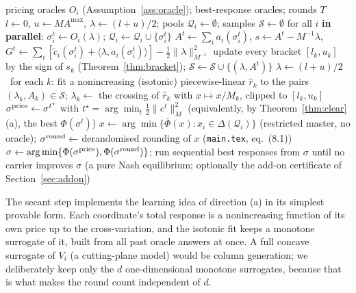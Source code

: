 \documentclass[11pt]{article}
\theoremstyle{definition}
\theoremstyle{remark}
\newcommand{\ip}[2]{\langle #1,#2\rangle}
\newcommand{\Amax}{A^{\max}}
\begin{document}
\begin{algorithm}[h]
\caption{ZMC: Zone-Market Clearing}\label{alg:zmc}
\begin{algorithmic}[1]
\Require pricing oracles $O_i$ (Assumption~\ref{ass:oracle}); best-response oracles; rounds $T$
\State $l\gets0$, $u\gets M\Amax$, $\lambda\gets(l+u)/2$; pools $\mathcal Q_i\gets\emptyset$; samples $\mathcal S\gets\emptyset$
 \State for all $i$ \textbf{in parallel}: $\sigma^t_i\gets O_i(\lambda)$; $\mathcal Q_i\gets\mathcal Q_i\cup\{\sigma^t_i\}$ 
 \State $A^t\gets\sum_ia_i(\sigma^t_i)$, $s\gets A^t-M^{-1}\lambda$, $G^t\gets\sum_i[\tilde c_i(\sigma^t_i)+\ip{\lambda}{a_i(\sigma^t_i)}]-\tfrac12\|\lambda\|^2_{M^{-1}}$
 \State update every bracket $[l_k,u_k]$ by the sign of $s_k$ (Theorem~\ref{thm:bracket}); $\mathcal S\gets\mathcal S\cup\{(\lambda,A^t)\}$
  $\lambda\gets(l+u)/2$
 \Else\ for each $k$: fit a nonincreasing (isotonic) piecewise-linear $\hat r_k$ to the pairs $(\lambda_k,A_k)\in\mathcal S$;
 \State \hspace{1.5em} $\lambda_k\gets$ the crossing of $\hat r_k$ with $x\mapsto x/M_k$, clipped to $[l_k,u_k]$ 
 \EndIf
\EndFor
\State $\sigma^{\rm price}\gets\sigma^{t^\star}$ with $t^\star=\arg\min_t\tfrac12\|e^t\|_M^2$ (equivalently, by Theorem~\ref{thm:clear}(a), the best $\Phi(\sigma^t)$)
\State $x\gets\arg\min\{\bar\Phi(x):x_i\in\Delta(\mathcal Q_i)\}$ (restricted master, no oracle); $\sigma^{\rm round}\gets$ derandomised rounding of $x$ (\texttt{main.tex}, eq.~(8.1))
\State $\sigma\gets\arg\min\{\Phi(\sigma^{\rm price}),\Phi(\sigma^{\rm round})\}$; run sequential best responses from $\sigma$ until no carrier improves
\State \Return $\sigma$ (a pure Nash equilibrium; optionally the add-on certificate of Section~\ref{sec:addon})
\end{algorithmic}
\end{algorithm}

The secant step implements the learning idea of direction (a) in its simplest provable form. Each coordinate's total response is a nonincreasing function of its own price up to the cross-variation, and the isotonic fit keeps a monotone surrogate of it, built from all past oracle answers at once. A full concave surrogate of $V_i$ (a cutting-plane model) would be column generation; we deliberately keep only the $d$ one-dimensional monotone surrogates, because that is what makes the round count independent of $d$.
\end{document}
